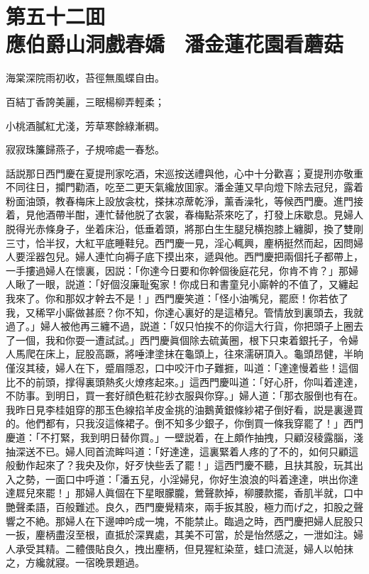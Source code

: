 
\chapter*{第五十二囬　\\應伯爵山洞戲春嬌　潘金蓮花園看蘑菇}
\thispagestyle{empty}

\begin{myquote}
海棠深院雨初收，苔徑無風蝶自由。

百結丁香誇美麗，三眠楊柳弄輕柔；

小桃酒膩紅尤淺，芳草寒餘綠漸稠。

寂寂珠簾歸燕子，子規啼處一春愁。
\end{myquote}

話説那日西門慶在夏提刑家吃酒，宋巡按送禮與他，心中十分歡喜；夏提刑亦敬重不同往日，攔門勸酒，吃至二更天氣纔放囬家。潘金蓮又早向燈下除去冠兒，露着粉面油頭，教春梅床上設放衾枕，搽抹凉蓆乾淨，薰香澡牝，等候西門慶。進門接着，見他酒帶半酣，連忙替他脱了衣裳，春梅點茶來吃了，打發上床歇息。見婦人脱得光赤條身子，坐着床沿，低垂着頭，將那白生生腿兒横抱膝上纏脚，換了雙剛三寸，恰半扠，大紅平底睡鞋兒。西門慶一見，淫心輒興，麈柄挺然而起，因問婦人要淫器包兒。婦人連忙向褥子底下摸出來，遞與他。西門慶把兩個托子都帶上，一手摟過婦人在懷裏，因説：「你達今日要和你幹個後庭花兒，你肯不肯？」那婦人瞅了一眼，説道：「好個沒廉耻寃家！你成日和書童兒小廝幹的不值了，又纏起我來了。你和那奴才幹去不是！」西門慶笑道：「怪小油嘴兒，罷麽！你若依了我，又稀罕小廝做甚麽？你不知，你達心裏好的是這樁兒。管情放到裏頭去，我就過了。」婦人被他再三纏不過，説道：「奴只怕挨不的你這大行貨，你把頭子上圈去了一個，我和你耍一遭試試。」西門慶眞個除去硫黃圈，根下只束着銀托子，令婦人馬爬在床上，屁股高蹶，將唾津塗抹在龜頭上，往來濡硏頂入。龜頭昂健，半晌僅沒其稜，婦人在下，蹙眉隱忍，口中咬汗巾子難捱，叫道：「達達慢着些！這個比不的前頭，撑得裏頭熱炙火燎疼起來。」這西門慶叫道：「好心肝，你叫着達達，不防事。到明日，買一套好顔色粧花紗衣服與你穿。」婦人道：「那衣服倒也有在。我昨日見李桂姐穿的那玉色線掐羊皮金挑的油鵝黄銀條紗裙子倒好看，説是裏邊買的。他們都有，只我沒這條裙子。倒不知多少銀子，你倒買一條我穿罷了！」西門慶道：「不打緊，我到明日替你買。」一壁説着，在上頗作抽拽，只顧沒稜露腦，淺抽深送不已。婦人囘首流眸呌道：「好達達，這裏緊着人疼的了不的，如何只顧這般動作起來了？我央及你，好歹快些丢了罷！」這西門慶不聽，且扶其股，玩其出入之勢，一面口中呼道：「潘五兒，小淫婦兒，你好生浪浪的呌着達達，哄出你達達㞞兒來罷！」那婦人眞個在下星眼朦朧，鶯聲款掉，柳腰款擺，香肌半就，口中艷聲柔語，百般難述。良久，西門慶覺精來，兩手扳其股，極力而げ之，扣股之聲響之不絶。那婦人在下邊呻吟成一塊，不能禁止。臨過之時，西門慶把婦人屁股只一扳，麈柄盡沒至根，直抵於深異處，其美不可當，於是怡然感之，一泄如注。婦人承受其精。二體偎貼良久，拽出麈柄，但見猩紅染莖，蛙口流涎，婦人以帕抹之，方纔就寢。一宿晚景題過。

